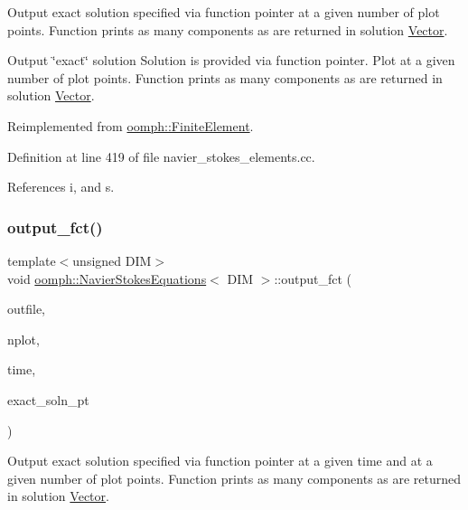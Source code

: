 Output exact solution specified via function pointer at a given number of plot points. Function prints as many components as are returned in solution \hyperlink{classoomph_1_1Vector}{Vector}. 

Output \char`\"{}exact\char`\"{} solution Solution is provided via function pointer. Plot at a given number of plot points. Function prints as many components as are returned in solution \hyperlink{classoomph_1_1Vector}{Vector}. 

Reimplemented from \hyperlink{classoomph_1_1FiniteElement_a22b695c714f60ee6cd145be348042035}{oomph\+::\+Finite\+Element}.



Definition at line 419 of file navier\+\_\+stokes\+\_\+elements.\+cc.



References i, and s.

\mbox{\label{classoomph_1_1NavierStokesEquations_ae2c60e77c8348895c883176845bcc5bd}} 
\subsubsection{\texorpdfstring{output\+\_\+fct()}{output\_fct()}\hspace{0.1cm}{\footnotesize\ttfamily [2/2]}}
{\footnotesize\ttfamily template$<$unsigned D\+IM$>$ \\
void \hyperlink{classoomph_1_1NavierStokesEquations}{oomph\+::\+Navier\+Stokes\+Equations}$<$ D\+IM $>$\+::output\+\_\+fct (\begin{DoxyParamCaption}\item[{std\+::ostream \&}]{outfile,  }\item[{const unsigned \&}]{nplot,  }\item[{const double \&}]{time,  }\item[{\hyperlink{classoomph_1_1FiniteElement_ad4ecf2b61b158a4b4d351a60d23c633e}{Finite\+Element\+::\+Unsteady\+Exact\+Solution\+Fct\+Pt}}]{exact\+\_\+soln\+\_\+pt }\end{DoxyParamCaption})\hspace{0.3cm}{\ttfamily [virtual]}}



Output exact solution specified via function pointer at a given time and at a given number of plot points. Function prints as many components as are returned in solution \hyperlink{classoomph_1_1Vector}{Vector}. 

